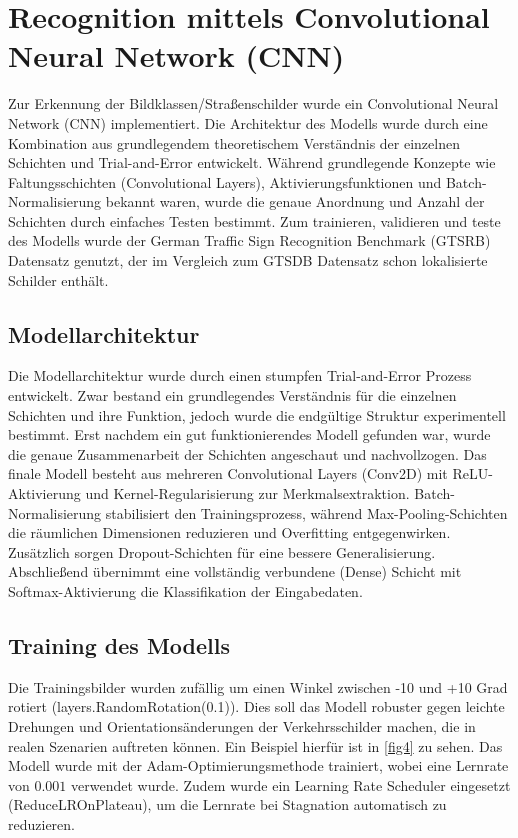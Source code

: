 \documentclass[runningheads]{llncs}
\begin{document}
\section{Recognition mittels Convolutional Neural Network (CNN)}\label{recog_cnn}
Zur Erkennung der Bildklassen/Straßenschilder wurde ein Convolutional Neural Network (CNN) implementiert. Die Architektur des Modells wurde
durch eine Kombination aus grundlegendem theoretischem Verständnis der einzelnen Schichten und Trial-and-Error entwickelt.
Während grundlegende Konzepte wie Faltungsschichten (Convolutional Layers), Aktivierungsfunktionen und Batch-Normalisierung
bekannt waren, wurde die genaue Anordnung und Anzahl der Schichten durch einfaches Testen bestimmt.
Zum trainieren, validieren und teste des Modells wurde der German Traffic Sign Recognition Benchmark (GTSRB) Datensatz genutzt, der
im Vergleich zum GTSDB Datensatz schon lokalisierte Schilder enthält.

\subsection{Modellarchitektur}
Die Modellarchitektur wurde durch einen stumpfen Trial-and-Error Prozess entwickelt. Zwar bestand ein grundlegendes Verständnis
für die einzelnen Schichten und ihre Funktion, jedoch wurde die endgültige Struktur experimentell bestimmt.
Erst nachdem ein gut funktionierendes Modell gefunden war, wurde die genaue Zusammenarbeit der Schichten angeschaut und
nachvollzogen. Das finale Modell besteht aus mehreren Convolutional Layers (Conv2D) mit ReLU-Aktivierung und Kernel-Regularisierung
zur Merkmalsextraktion. Batch-Normalisierung stabilisiert den Trainingsprozess, während Max-Pooling-Schichten die räumlichen
Dimensionen reduzieren und Overfitting entgegenwirken. Zusätzlich sorgen Dropout-Schichten für eine bessere Generalisierung.
Abschließend übernimmt eine vollständig verbundene (Dense) Schicht mit Softmax-Aktivierung die Klassifikation der Eingabedaten.

\subsection{Training des Modells}
Die Trainingsbilder wurden zufällig um einen Winkel zwischen -10 und +10 Grad rotiert (layers.RandomRotation(0.1)). Dies soll das Modell
robuster gegen leichte Drehungen und Orientationsänderungen der Verkehrsschilder machen, die in realen Szenarien auftreten können. Ein Beispiel
hierfür ist in \ref{fig4} zu sehen. Das Modell wurde mit der Adam-Optimierungsmethode trainiert, wobei eine Lernrate von $0.001$ verwendet wurde. Zudem wurde ein
Learning Rate Scheduler eingesetzt (ReduceLROnPlateau), um die Lernrate bei Stagnation automatisch zu reduzieren.
\end{document}
